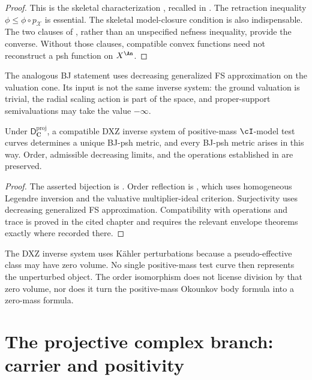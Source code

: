 \begin{proof}
This is the skeletal characterization
\cite[Section~7]{BFJ16}, recalled in
.
The retraction inequality
$\phi\leq\phi\circ p_{\mathcal X}$ is essential.
The skeletal model-closure condition is also indispensable. The two
clauses of , rather than an unspecified nefness
inequality, provide the converse. Without those clauses, compatible convex
functions need not reconstruct a psh function on $X^{\An}$.
\end{proof}

The analogous BJ statement uses decreasing generalized FS approximation on
the valuation cone.
Its input is not the same inverse system: the ground valuation is trivial,
the radial scaling action is part of the space, and proper-support
semivaluations may take the value $-\infty$.

\begin{proposition}\label{prop:dict-projective-realization}
Under $\mathsf D_{\mathbf C}^{\mathrm{proj}}$, a compatible DXZ inverse
system of positive-mass $\cI$-model test curves determines a unique BJ-psh
metric, and every BJ-psh metric arises in this way.
Order, admissible decreasing limits, and the operations established in
 are preserved.
\end{proposition}

\begin{proof}
The asserted bijection is .
Order reflection is , which uses
homogeneous Legendre inversion and the valuative multiplier-ideal criterion.
Surjectivity uses decreasing generalized FS approximation.
Compatibility with operations and trace is proved in the cited chapter and
requires the relevant envelope theorems exactly where recorded there.
\end{proof}

\begin{remark}
\label{rem:dict-zero-mass}
The DXZ inverse system uses K\"ahler perturbations because a
pseudo-effective class may have zero volume.
No single positive-mass test curve then represents the unperturbed object.
The order isomorphism does not license division by that zero volume, nor does
it turn the positive-mass Okounkov body formula into a zero-mass formula.
\end{remark}

\section{The projective complex branch: carrier and positivity}
\label{sec:dict-projective-complex-branch}

